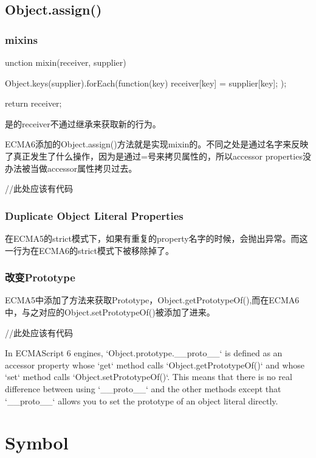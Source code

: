 \subsection{Object.assign()}

\subsubsection{mixins} 

\begin{JavaScript}
unction mixin(receiver, supplier) {
    Object.keys(supplier).forEach(function(key) {
        receiver[key] = supplier[key];
    });

    return receiver;
}
\end{JavaScript}

是的receiver不通过继承来获取新的行为。


ECMA6添加的Object.assign()方法就是实现mixin的。不同之处是通过名字来反映了真正发生了什么操作，因为是通过=号来拷贝属性的，所以accessor properties没办法被当做accessor属性拷贝过去。

\begin{JavaScript}
//此处应该有代码
\end{JavaScript}

\subsubsection{Duplicate Object Literal Properties}
在ECMA5的strict模式下，如果有重复的property名字的时候，会抛出异常。而这一行为在ECMA6的strict模式下被移除掉了。

\subsubsection{改变Prototype}
ECMA5中添加了方法来获取Prototype，Object.getPrototypeOf(),而在ECMA6中，与之对应的Object.setPrototypeOf()被添加了进来。
\begin{JavaScript}
//此处应该有代码
\end{JavaScript}

In ECMAScript 6 engines, `Object.prototype.__proto__` is defined as an accessor property whose `get` method calls `Object.getPrototypeOf()` and whose `set` method calls `Object.setPrototypeOf()`. This means that there is no real difference between using `__proto__` and the other methods except that `__proto__` allows you to set the prototype of an object literal directly.

 
\section{Symbol}